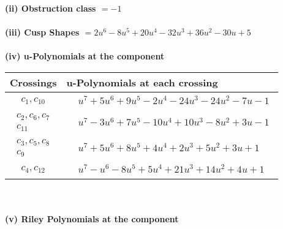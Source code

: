 \documentclass[1p]{elsarticle_modified}
\theoremstyle{definition}
\begin{document}
\flushleft \textbf{(ii) Obstruction class $= -1$}\\~\\
\flushleft \textbf{(iii) Cusp Shapes $= 2 u^6-8 u^5+20 u^4-32 u^3+36 u^2-30 u+5$}\\~\\
\newpage\renewcommand{\arraystretch}{1}
\flushleft \textbf{(iv) u-Polynomials at the component}\newline \\
\begin{tabular}{m{50pt}|m{274pt}}
Crossings & \hspace{64pt}u-Polynomials at each crossing \\
\hline $$\begin{aligned}c_{1},c_{10}\end{aligned}$$&$\begin{aligned}
&u^7+5 u^6+9 u^5-2 u^4-24 u^3-24 u^2-7 u-1
\end{aligned}$\\
\hline $$\begin{aligned}c_{2},c_{6},c_{7}\\c_{11}\end{aligned}$$&$\begin{aligned}
&u^7-3 u^6+7 u^5-10 u^4+10 u^3-8 u^2+3 u-1
\end{aligned}$\\
\hline $$\begin{aligned}c_{3},c_{5},c_{8}\\c_{9}\end{aligned}$$&$\begin{aligned}
&u^7+5 u^6+8 u^5+4 u^4+2 u^3+5 u^2+3 u+1
\end{aligned}$\\
\hline $$\begin{aligned}c_{4},c_{12}\end{aligned}$$&$\begin{aligned}
&u^7- u^6-8 u^5+5 u^4+21 u^3+14 u^2+4 u+1
\end{aligned}$\\
\hline
\end{tabular}\\~\\
\newpage\renewcommand{\arraystretch}{1}
\flushleft \textbf{(v) Riley Polynomials at the component}\newline \\
\end{document}
